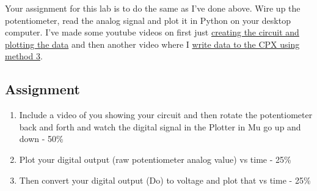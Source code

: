 Your assignment for this lab is to do the same as I’ve done above. Wire up the potentiometer, read the analog signal and plot it in Python on your desktop computer. I’ve made some youtube videos on first just \href{https://youtu.be/_gnDvPOvPqk}{creating the circuit and plotting the data} and then another video where I \href{https://youtu.be/9UF3OVUIYjU}{write data to the CPX using method 3}.

\subsection{Assignment}



\begin{enumerate}[itemsep=-5pt]
\item Include a video of you showing your circuit and then rotate the potentiometer back and forth and watch the digital signal in the Plotter in Mu go up and down - 50\%
\item Plot your digital output (raw potentiometer analog value) vs time - 25\%
\item Then convert your digital output (Do) to voltage and plot that vs time - 25\% 
\end{enumerate}
